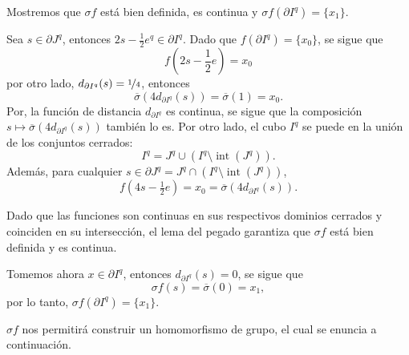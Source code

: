     Mostremos que $\sigma f$ está bien definida, es continua y $\sigma f(\partial I^q)=\{x_1\}$. 
    
    Sea $s\in\partial J^q$, entonces $2s-\frac{1}{2}e^q\in \partial I^q$. Dado que $f(\partial I^q)=\{x_0\}$, se sigue que 
    \begin{equation*}
        f(2s-\textstyle\frac{1}{2}e)=x_0    
    \end{equation*}
    por otro lado, $d_{\partial I^q}(s)=\nicefrac{1}{4}$, entonces
    \begin{equation*}
        \overline{\sigma}(4d_{\partial I^q}(s))=\overline{\sigma}(1)=x_0.
    \end{equation*}
    Por,  
    la función de distancia $d_{\partial I^q}$ es continua, se sigue que la composición $s \mapsto \overline{\sigma}(4d_{\partial I^q}(s))$ también lo es. Por otro lado, el cubo $I^q$ se puede en la unión de los conjuntos cerrados:
    $$I^q = J^q \cup (I^q \setminus \operatorname{int}(J^q)).$$
    Además, para cualquier $s \in \partial J^q = J^q \cap (I^q \setminus \operatorname{int}(J^q))$, 
    $$f(4s - \tfrac{1}{2}e) = x_0 = \overline{\sigma}(4d_{\partial I^q}(s)).$$
    
    Dado que las funciones son continuas en sus respectivos dominios cerrados y coinciden en su intersección, el lema del pegado garantiza que $\sigma f$ está bien definida y es continua.
    
    Tomemos ahora $x\in\partial I^q$, entonces  $d_{\partial I^q}(s)=0$, se sigue que
    \begin{equation*}
        \sigma f(s)=\overline{\sigma}(0)=x_1,
    \end{equation*}
    por lo tanto, $\sigma f(\partial I^q)=\{x_1\}$.

    $\sigma f$ nos permitirá construir un homomorfismo de grupo, el cual se enuncia a continuación.


